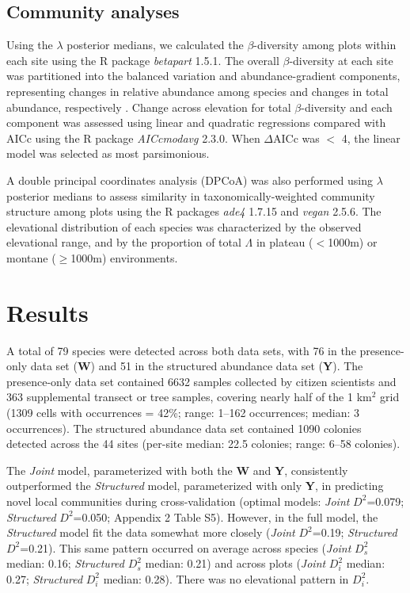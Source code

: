 \documentclass[preprint,review,times,12pt,3p]{elsarticle}
\begin{document}
\subsection{Community analyses}
Using the $\lambda$ posterior medians, we calculated the $\beta$-diversity among plots within each site using the R package \emph{betapart} 1.5.1. The overall $\beta$-diversity at each site was partitioned into the balanced variation and abundance-gradient components, representing changes in relative abundance among species and changes in total abundance, respectively \citep{Baselga2017}. Change across elevation for total $\beta$-diversity and each component was assessed using linear and quadratic regressions compared with AICc using the R package \emph{AICcmodavg} 2.3.0. When $\Delta$AICc was $<$ 4, the linear model was selected as most parsimonious. 

A double principal coordinates analysis (DPCoA) was also performed using $\lambda$ posterior medians to assess similarity in taxonomically-weighted community structure among plots \citep{Dray2015,Pavoine2019} using the R packages \emph{ade4} 1.7.15 and \emph{vegan} 2.5.6. The elevational distribution of each species was characterized by the observed elevational range, and by the proportion of total $\Lambda$ in plateau ($<$1000m) or montane ($\geq$1000m) environments.




\section{Results}
\label{S:3}
A total of 79 species were detected across both data sets, with 76 in the presence-only data set (\textbf{W}) and 51 in the structured abundance data set (\textbf{Y}). The presence-only data set contained 6632 samples collected by citizen scientists and 363 supplemental transect or tree samples, covering nearly half of the 1 km$^2$ grid (1309 cells with occurrences = 42\%; range: 1–162 occurrences; median: 3 occurrences). The structured abundance data set contained 1090 colonies detected across the 44 sites (per-site median: 22.5 colonies; range: 6–58 colonies). 

The \emph{Joint} model, parameterized with both the \textbf{W} and \textbf{Y}, consistently outperformed the \emph{Structured} model, parameterized with only \textbf{Y}, in predicting novel local communities during cross-validation (optimal models: \emph{Joint} $D^2$=0.079; \emph{Structured} $D^2$=0.050; Appendix 2 Table S5). However, in the full model, the \emph{Structured} model fit the data somewhat more closely (\emph{Joint} $D^2$=0.19; \emph{Structured} $D^2$=0.21). This same pattern occurred on average across species (\emph{Joint} $D^2_s$ median: 0.16; \emph{Structured} $D^2_s$ median: 0.21) and across plots (\emph{Joint} $D^2_i$ median: 0.27; \emph{Structured} $D^2_i$ median: 0.28). There was no elevational pattern in $D^2_i$.
\end{document}
